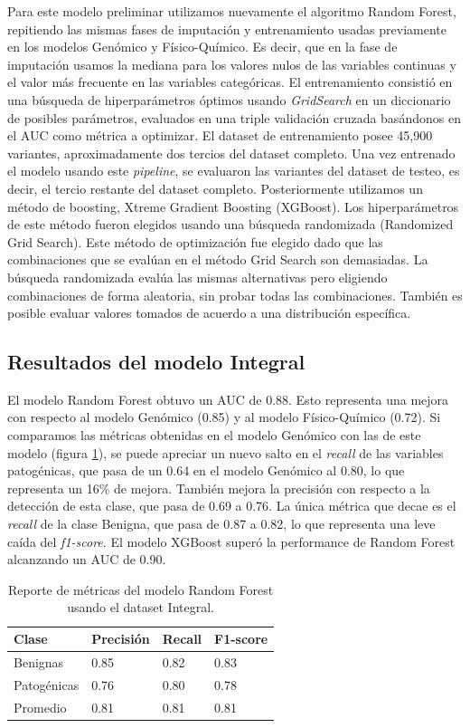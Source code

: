 Para este modelo preliminar utilizamos nuevamente el algoritmo Random Forest, repitiendo las mismas fases de imputación y entrenamiento usadas previamente en los modelos Genómico y Físico-Químico. Es decir, que en la fase de imputación usamos la mediana para los valores nulos de las variables continuas y el valor más frecuente en las variables categóricas. El entrenamiento consistió en una búsqueda de hiperparámetros óptimos usando \textit{GridSearch} en un diccionario de posibles parámetros, evaluados en una triple validación cruzada basándonos en el AUC como métrica a optimizar. El dataset de entrenamiento posee 45,900 variantes, aproximadamente dos tercios del dataset completo. Una vez entrenado el modelo usando este \textit{pipeline}, se evaluaron las variantes del dataset de testeo, es decir, el tercio restante del dataset completo. Posteriormente utilizamos un método de boosting, Xtreme Gradient Boosting (XGBoost). Los hiperparámetros de este método fueron elegidos usando una búsqueda randomizada (Randomized Grid Search). Este método de optimización fue elegido dado que las combinaciones que se evalúan en el método Grid Search son demasiadas. La búsqueda randomizada evalúa las mismas alternativas pero eligiendo combinaciones de forma aleatoria, sin probar todas las combinaciones. También es posible evaluar valores tomados de acuerdo a una distribución específica.

\subsection{Resultados del modelo Integral}

El modelo Random Forest obtuvo un AUC de 0.88. Esto representa una mejora con respecto al modelo Genómico (0.85) y al modelo Físico-Químico (0.72). Si comparamos las métricas obtenidas en el modelo Genómico con las de este modelo (figura \ref{tab:metrics_integral}), se puede apreciar un nuevo salto en el \textit{recall} de las variables patogénicas, que pasa de un 0.64 en el modelo Genómico al 0.80, lo que representa un 16\% de mejora. También mejora la precisión con respecto a la detección de esta clase, que pasa de 0.69 a 0.76. La única métrica que decae es el \textit{recall} de la clase Benigna, que pasa de 0.87 a 0.82, lo que representa una leve caída del \textit{f1-score}. El modelo XGBoost superó la performance de Random Forest alcanzando un AUC de 0.90.

\begin{table}[H]
\centering
\begin{tabular}{|l|l|l|l|}
\hline
Clase        & Precisión & Recall & F1-score \\ \hline
Benignas     & 0.85      & 0.82   & 0.83     \\ \hline
Patogénicas  & 0.76      & 0.80   & 0.78     \\ \hline
Promedio     & 0.81      & 0.81   & 0.81     \\ \hline
\end{tabular}
\caption{Reporte de métricas del modelo Random Forest usando el dataset Integral.}
\label{tab:metrics_integral}
\end{table}


